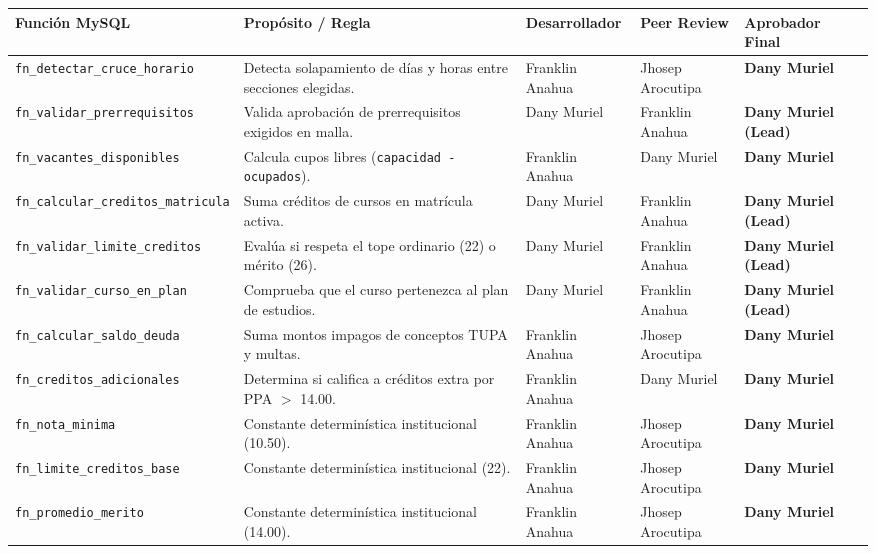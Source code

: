 \documentclass[11pt,a4paper]{article}
\begin{document}
\begin{longtable}{p{4.2cm} p{3.8cm} p{2.2cm} p{2.5cm} p{2.2cm}}
\toprule
\textbf{Función MySQL} & \textbf{Propósito / Regla} & \textbf{Desarrollador} & \textbf{Peer Review} & \textbf{Aprobador Final} \\
\midrule
\endhead
\texttt{fn\_detectar\_cruce\_horario} & Detecta solapamiento de días y horas entre secciones elegidas. & Franklin Anahua & Jhosep Arocutipa & \textbf{Dany Muriel} \\
\rowcolor{rowgray}
\texttt{fn\_validar\_prerrequisitos} & Valida aprobación de prerrequisitos exigidos en malla. & Dany Muriel & Franklin Anahua & \textbf{Dany Muriel (Lead)} \\
\texttt{fn\_vacantes\_disponibles} & Calcula cupos libres (\texttt{capacidad - ocupados}). & Franklin Anahua & Dany Muriel & \textbf{Dany Muriel} \\
\rowcolor{rowgray}
\texttt{fn\_calcular\_creditos\_matricula} & Suma créditos de cursos en matrícula activa. & Dany Muriel & Franklin Anahua & \textbf{Dany Muriel (Lead)} \\
\texttt{fn\_validar\_limite\_creditos} & Evalúa si respeta el tope ordinario (22) o mérito (26). & Dany Muriel & Franklin Anahua & \textbf{Dany Muriel (Lead)} \\
\rowcolor{rowgray}
\texttt{fn\_validar\_curso\_en\_plan} & Comprueba que el curso pertenezca al plan de estudios. & Dany Muriel & Franklin Anahua & \textbf{Dany Muriel (Lead)} \\
\texttt{fn\_calcular\_saldo\_deuda} & Suma montos impagos de conceptos TUPA y multas. & Franklin Anahua & Jhosep Arocutipa & \textbf{Dany Muriel} \\
\rowcolor{rowgray}
\texttt{fn\_creditos\_adicionales} & Determina si califica a créditos extra por PPA $>$ 14.00. & Franklin Anahua & Dany Muriel & \textbf{Dany Muriel} \\
\texttt{fn\_nota\_minima} & Constante determinística institucional (10.50). & Franklin Anahua & Jhosep Arocutipa & \textbf{Dany Muriel} \\
\rowcolor{rowgray}
\texttt{fn\_limite\_creditos\_base} & Constante determinística institucional (22). & Franklin Anahua & Jhosep Arocutipa & \textbf{Dany Muriel} \\
\texttt{fn\_promedio\_merito} & Constante determinística institucional (14.00). & Franklin Anahua & Jhosep Arocutipa & \textbf{Dany Muriel} \\
\bottomrule
\end{longtable}
\end{document}
